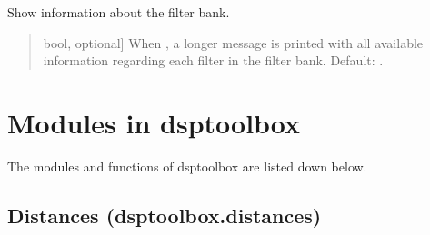 \documentclass[letterpaper,10pt,english]{sphinxmanual}
\begin{document}
\begin{fulllineitems}
\begin{fulllineitems}
\label{\detokenize{classes:dsptoolbox.classes.filterbank.FilterBank.show_info}}
\pysigstartsignatures
{}
\pysigstopsignatures
\sphinxAtStartPar
Show information about the filter bank.
\begin{quote}\begin{description}
\begin{description}
\sphinxlineitem{\sphinxstylestrong{show\_filters\_info}}{[}bool, optional{]}
\sphinxAtStartPar
When , a longer message is printed with all available
information regarding each filter in the filter bank.
Default: .

\end{description}

\end{description}\end{quote}

\end{fulllineitems}


\end{fulllineitems}


\sphinxstepscope


\chapter{Modules in dsptoolbox}
\label{\detokenize{modules:modules-in-dsptoolbox}}\label{\detokenize{modules::doc}}
\sphinxAtStartPar
The modules and functions of dsptoolbox are listed down below.

\sphinxstepscope


\section{Distances (dsptoolbox.distances)}
\label{\detokenize{modules/dsptoolbox.distances:module-dsptoolbox.distances}}\label{\detokenize{modules/dsptoolbox.distances:distances-dsptoolbox-distances}}\label{\detokenize{modules/dsptoolbox.distances::doc}}
\end{document}

